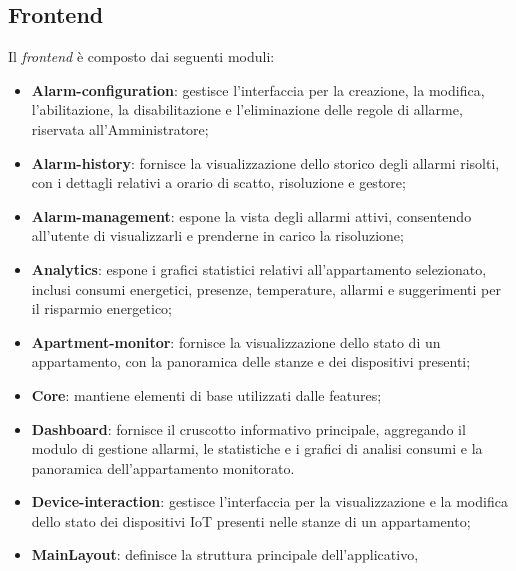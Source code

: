 \documentclass[10pt, letterpaper]{article}
\begin{document}













\subsection{Frontend}
Il \textit{frontend} è composto dai seguenti moduli:
\begin{itemize}

    \item \textbf{Alarm-configuration}: gestisce l'interfaccia per la creazione, la modifica, 
    l'abilitazione, la disabilitazione e l'eliminazione delle regole di allarme, 
    riservata all'Amministratore;
    \item \textbf{Alarm-history}: fornisce la visualizzazione dello storico degli allarmi 
    risolti, con i dettagli relativi a orario di scatto, risoluzione e gestore;
    \item \textbf{Alarm-management}: espone la vista degli allarmi attivi, consentendo 
    all'utente di visualizzarli e prenderne in carico la risoluzione;
    \item \textbf{Analytics}: espone i grafici statistici relativi all'appartamento 
    selezionato, inclusi consumi energetici, presenze, temperature, allarmi e suggerimenti 
    per il risparmio energetico;
    \item \textbf{Apartment-monitor}: fornisce la visualizzazione dello stato di un 
    appartamento, con la panoramica delle stanze e dei dispositivi presenti;
    \item \textbf{Core}: mantiene elementi di base utilizzati dalle features;
    \item \textbf{Dashboard}: fornisce il cruscotto informativo principale, aggregando 
    il modulo di gestione allarmi, le statistiche e i grafici di analisi consumi 
    e la panoramica dell'appartamento monitorato.
    \item \textbf{Device-interaction}: gestisce l'interfaccia per la visualizzazione 
    e la modifica dello stato dei dispositivi IoT presenti nelle stanze di un appartamento;
     \item \textbf{MainLayout}: definisce la struttura principale dell'applicativo, 

\end{itemize}
\end{document}
